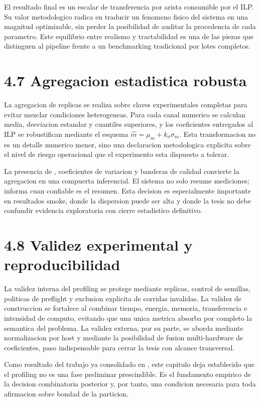 El resultado final es un escalar de transferencia por arista consumible por el ILP. Su valor metodologico radica en traducir un fenomeno fisico del sistema en una magnitud optimizable, sin perder la posibilidad de auditar la procedencia de cada parametro. Este equilibrio entre realismo y tractabilidad es una de las piezas que distinguen al pipeline frente a un benchmarking tradicional por lotes completos.

\section{4.7 Agregacion estadistica robusta}
La agregacion de replicas se realiza sobre claves experimentales completas para evitar mezclar condiciones heterogeneas. Para cada canal numerico se calculan media, desviacion estandar y cuantiles superiores, y los coeficientes entregados al ILP se robustifican mediante el esquema $\hat{m}=\mu_m+k_\sigma\sigma_m$. Esta transformacion no es un detalle numerico menor, sino una declaracion metodologica explicita sobre el nivel de riesgo operacional que el experimento esta dispuesto a tolerar.

La presencia de , coeficientes de variacion y banderas de calidad convierte la agregacion en una compuerta inferencial. El sistema no solo resume mediciones; informa cuan confiable es el resumen. Esta decision es especialmente importante en resultados smoke, donde la dispersion puede ser alta y donde la tesis no debe confundir evidencia exploratoria con cierre estadistico definitivo.

\section{4.8 Validez experimental y reproducibilidad}
La validez interna del profiling se protege mediante replicas, control de semillas, politicas de preflight y exclusion explicita de corridas invalidas. La validez de construccion se fortalece al combinar tiempo, energia, memoria, transferencia e intensidad de computo, evitando que una unica metrica absorba por completo la semantica del problema. La validez externa, por su parte, se aborda mediante normalizacion por host y mediante la posibilidad de fusion multi-hardware de coeficientes, paso indispensable para cerrar la tesis con alcance transversal.

Como resultado del trabajo ya consolidado en , este capitulo deja establecido que el profiling no es una fase preliminar prescindible. Es el fundamento empirico de la decision combinatoria posterior y, por tanto, una condicion necesaria para toda afirmacion sobre bondad de la particion.

